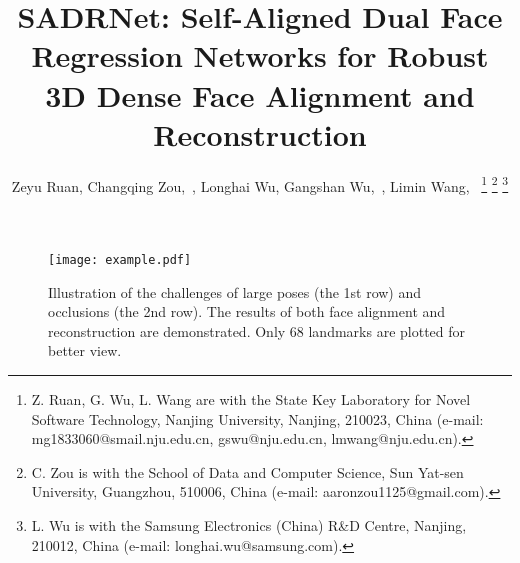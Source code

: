\documentclass[journal]{IEEEtran}
\begin{document}
\title{SADRNet: Self-Aligned Dual Face Regression Networks for Robust 3D Dense Face Alignment and Reconstruction}


	\author{Zeyu Ruan,
		Changqing Zou,~,
		Longhai Wu,
		Gangshan Wu,~,
		Limin Wang,~
		\thanks{Z. Ruan, G. Wu, L. Wang are with  the  State  Key  Laboratory for Novel Software Technology, Nanjing University, Nanjing, 210023, China (e-mail: mg1833060@smail.nju.edu.cn, gswu@nju.edu.cn, lmwang@nju.edu.cn).}
		\thanks{C. Zou is with the School of Data and Computer Science, Sun Yat-sen University, Guangzhou, 510006, China (e-mail: aaronzou1125@gmail.com).}
		\thanks{L. Wu is with the Samsung Electronics (China) R\&D Centre, Nanjing, 210012, China (e-mail: longhai.wu@samsung.com).}
	}



	
	


	
	
	


	
	


	
	
	
\maketitle
	
	\begin{figure*}[ht]
		\begin{center}
		\texttt{[image: example.pdf]}
		\end{center}
		\caption{ Illustration of the challenges of large poses (the 1st row) and occlusions (the 2nd row). The results of both face alignment and reconstruction are demonstrated. Only 68 landmarks are plotted for better view.
		}
		\label{fig:example}
	\end{figure*}
	
\end{document}

